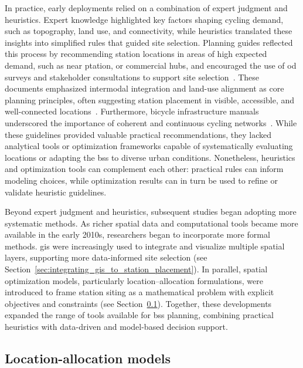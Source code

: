 In practice, early deployments relied on a combination of expert judgment and heuristics. Expert knowledge highlighted key factors shaping cycling demand, such as topography, land use, and connectivity, while heuristics translated these insights into simplified rules that guided site selection. Planning guides reflected this process by recommending station locations in areas of high expected demand, such as near \ac{pt}ation, or commercial hubs, and encouraged the use of \ac{od} surveys and stakeholder consultations to support site selection~\cite{Ferrando2007, Yanocha2018}. These documents emphasized intermodal integration and land-use alignment as core planning principles, often suggesting station placement in visible, accessible, and well-connected locations~\cite{Ferrando2007, Yanocha2018, CROW2006}. Furthermore, bicycle infrastructure manuals underscored the importance of coherent and continuous cycling networks~\cite{AASHTO1999bicycle, CROW2006}. While these guidelines provided valuable practical recommendations, they lacked analytical tools or optimization frameworks capable of systematically evaluating locations or adapting the \ac{bss} to diverse urban conditions. Nonetheless, heuristics and optimization tools can complement each other: practical rules can inform modeling choices, while optimization results can in turn be used to refine or validate heuristic guidelines.

Beyond expert judgment and heuristics, subsequent studies began adopting more systematic methods. As richer spatial data and computational tools became more available in the early 2010s, researchers began to incorporate more formal methods. \ac{gis} were increasingly used to integrate and visualize multiple spatial layers, supporting more data-informed site selection (see Section~\ref{sec:integrating_gis_to_station_placement}). In parallel, spatial optimization models, particularly location–allocation formulations, were introduced to frame station siting as a mathematical problem with explicit objectives and constraints (see Section~\ref{sec:location_allocation_models}). Together, these developments expanded the range of tools available for \ac{bss} planning, combining practical heuristics with data-driven and model-based decision support.


\subsection{Location-allocation models} \label{sec:location_allocation_models}


